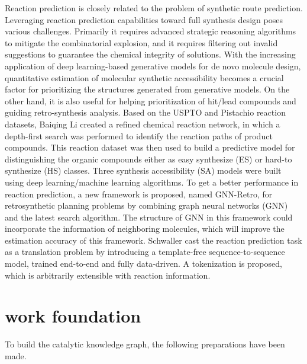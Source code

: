 \documentclass[%
 aip,
 jmp,%
 amsmath,amssymb,
 reprint,%
]{revtex4-2}
\begin{document}
Reaction prediction is closely related to the problem of synthetic route prediction. 
Leveraging reaction prediction capabilities toward full synthesis design poses various challenges. 
Primarily it requires advanced strategic reasoning algorithms to mitigate the combinatorial explosion, 
and it requires filtering out invalid suggestions to guarantee the chemical integrity of solutions\cite{ravitz2013data}.
With the increasing application of deep learning-based generative models for de novo
molecule design, quantitative estimation of molecular synthetic accessibility becomes
a crucial factor for prioritizing the structures generated from generative models. On the 
other hand, it is also useful for helping prioritization of hit/lead compounds and guiding 
retro-synthesis analysis. Based on the USPTO and Pistachio reaction datasets,
Baiqing Li created a refined chemical reaction network, in which a depth-first search 
was performed to identify the reaction paths of product compounds. This 
reaction dataset was then used to build a predictive model for distinguishing the organic 
compounds either as easy synthesize (ES) or hard-to synthesize (HS) classes. Three 
synthesis accessibility (SA) models were built using deep learning/machine learning 
algorithms\cite{li2022prediction}.
To get a better performance in reaction prediction, a new framework is proposed, named GNN-Retro, for
retrosynthetic planning problems by combining graph neural
networks (GNN) and the latest search algorithm. 
The structure of GNN in this framework could incorporate the information of neighboring molecules, 
which will improve the estimation accuracy of this framework\cite{han2022gnn}.
Schwaller cast the reaction
prediction task as a translation problem by introducing a template-free sequence-to-sequence model,
trained end-to-end and fully data-driven. A tokenization is proposed, which is arbitrarily extensible with
reaction information\cite{schwaller2018found}.


\section{work foundation}
To build the catalytic knowledge graph, the following preparations have been made.
\end{document}
